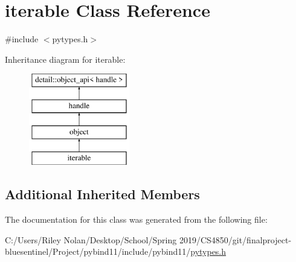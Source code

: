 \hypertarget{classiterable}{}\section{iterable Class Reference}
\label{classiterable}


{\ttfamily \#include $<$pytypes.\+h$>$}

Inheritance diagram for iterable\+:\begin{figure}[H]
\begin{center}
\leavevmode
\includegraphics[height=4.000000cm]{classiterable}
\end{center}
\end{figure}
\subsection*{Additional Inherited Members}


The documentation for this class was generated from the following file\+:\begin{DoxyCompactItemize}
\item 
C\+:/\+Users/\+Riley Nolan/\+Desktop/\+School/\+Spring 2019/\+C\+S4850/git/finalproject-\/bluesentinel/\+Project/pybind11/include/pybind11/\mbox{\hyperlink{pytypes_8h}{pytypes.\+h}}\end{DoxyCompactItemize}
